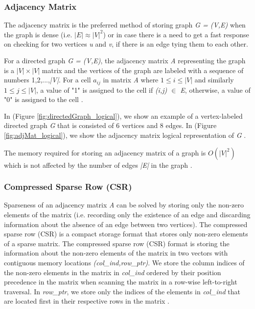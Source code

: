 {\subsubsection{Adjacency Matrix}
\label{subsubsec:AdjacencyMatrix}

The adjacency matrix is the preferred method of storing graph \textit{G = (V,E)} when the graph is dense (i.e. \textit{$|E| \approx |V|^2$}) or in case there is a need to get a fast response on checking for two vertices \textit{u} and \textit{v}, if there is an edge tying them to each other. 

For a directed graph \textit{G = (V,E)}, the adjacency matrix \textit{A} representing the graph is a \textit{$|V| \times |V|$} matrix and the vertices of the graph are labeled with a sequence of numbers 1,2,...,\textit{|V|}. For a cell \textit{$a_{ij}$} in matrix \textit{A} where \textit{$1 \leq i \leq |V|$} and similarly \textit{$1 \leq j \leq |V|$}, a value of "1" is assigned to the cell if \textit{(i,j) \(\in\) E}, otherwise, a value of "0" is assigned to the cell \cite{cormen2009introduction}.

In (Figure \ref{fig:directedGraph_logical}), we show an example of a vertex-labeled directed graph \textit{G} that is consisted of 6 vertices and 8 edges. In (Figure \ref{fig:adjMat_logical}), we show the adjacency matrix logical representation of \textit{G} \cite{cormen2009introduction}. 

The memory required for storing an adjacency matrix of a graph is $O(|V|^2)$ which is not affected by the number of edges \textit{|E|} in the graph \cite{cormen2009introduction}.



\subsubsection{Compressed Sparse Row (CSR)}
\label{subsubsec:CSR}

Sparseness of an adjacency matrix \textit{A} can be solved by storing only the non-zero elements of the matrix (i.e. recording only the existence of an edge and discarding information about the absence of an edge between two vertices). The compressed sparse row (CSR) is a compact storage format that stores only non-zero elements of a sparse matrix. The compressed sparse row (CSR) format is storing the information about the non-zero elements of the matrix in two vectors with contiguous memory locations \textit{(col\_ind,row\_ptr)}. We store the column indices of the non-zero elements in the matrix in \textit{col\_ind} ordered by their position precedence in the matrix when scanning the matrix in a row-wise left-to-right traversal. In \textit{row\_ptr}, we store only the indices of the elements in \textit{col\_ind} that are located first in their respective rows in the matrix \cite{Bai:2000:TSA:357352,Paradies2017}.

}

